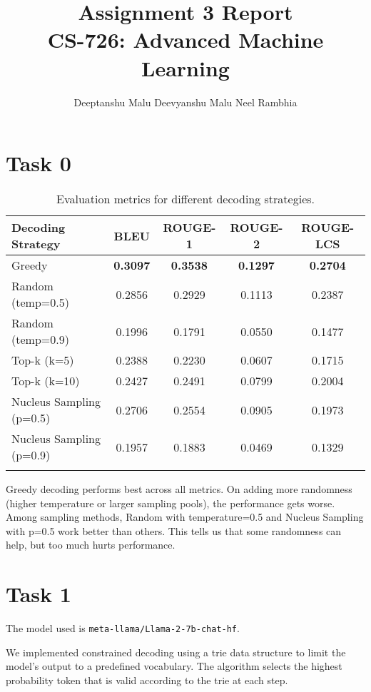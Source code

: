\documentclass[11pt]{article}
\title{Assignment 3 Report\\
    CS-726: Advanced Machine Learning}
\author{Deeptanshu Malu \quad Deevyanshu Malu \quad Neel Rambhia}
\date{}
\begin{document}
\maketitle

\section{Task 0}
\begin{longtable}{|l|c|c|c|c|}
    \hline
    \textbf{Decoding Strategy} & \textbf{BLEU} & \textbf{ROUGE-1} & \textbf{ROUGE-2} & \textbf{ROUGE-LCS} \\
    \hline
    Greedy & \textbf{0.3097} & \textbf{0.3538} & \textbf{0.1297} & \textbf{0.2704} \\
    \hline
    Random (temp=0.5) & 0.2856 & 0.2929 & 0.1113 & 0.2387 \\
    \hline
    Random (temp=0.9) & 0.1996 & 0.1791 & 0.0550 & 0.1477 \\
    \hline
    Top-k (k=5) & 0.2388 & 0.2230 & 0.0607 & 0.1715 \\
    \hline
    Top-k (k=10) & 0.2427 & 0.2491 & 0.0799 & 0.2004 \\
    \hline
    Nucleus Sampling (p=0.5) & 0.2706 & 0.2554 & 0.0905 & 0.1973 \\
    \hline
    Nucleus Sampling (p=0.9) & 0.1957 & 0.1883 & 0.0469 & 0.1329 \\
    \hline
    \caption{Evaluation metrics for different decoding strategies.}
\end{longtable}

Greedy decoding performs best across all metrics. On adding more randomness (higher temperature or larger sampling pools), the performance gets worse. Among sampling methods, Random with temperature=0.5 and Nucleus Sampling with p=0.5 work better than others. This tells us that some randomness can help, but too much hurts performance.

\section{Task 1}
The model used is \texttt{meta-llama/Llama-2-7b-chat-hf}.

We implemented constrained decoding using a trie data structure to limit the model's output to a predefined vocabulary. The algorithm selects the highest probability token that is valid according to the trie at each step.
\end{document}
